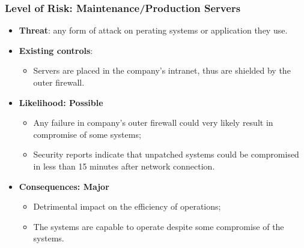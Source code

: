 \documentclass[xcolor ={table,usenames,dvipsnames}]{beamer}
\theoremstyle{definition}
\begin{document}
	\begin{frame}
		\frametitle{Level of Risk: Maintenance/Production Servers}
		\begin{itemize}
			\item \textbf{Threat}: any form of attack on perating systems or application they use.
			\item \textbf{Existing controls}: 
			\begin{itemize}
				\item Servers are placed in the company's intranet, thus are shielded by the outer firewall. 
			\end{itemize} 
			\item \textbf{Likelihood: Possible  }
			\begin{itemize}
				\item Any failure in company's outer firewall could very likely result in compromise of some systems;
				\item Security reports indicate that unpatched systems could be compromised in less than 15 minutes after network connection.  
			\end{itemize}	
			\item \textbf{Consequences: Major }
			\begin{itemize}
				\item Detrimental impact on the efficiency of operations;
				\item The systems are capable to operate despite some compromise of the systems.
			\end{itemize}
		\end{itemize}
	\end{frame}
\end{document}
